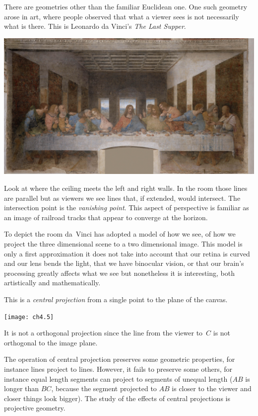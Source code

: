 There are geometries other than the familiar Euclidean one.
One such geometry arose in art, where people observed
that what a viewer sees is not necessarily what is there.
This is Leonardo da Vinci's 
\emph{The Last Supper}.
\begin{center} 
  \includegraphics[width=.5\textwidth]{LastSupper.jpg}
\end{center}
Look at where the ceiling meets the left and right walls.
In the room those lines are parallel but 
as viewers we see lines that, if extended, would intersect.
The intersection point is the \emph{vanishing point}.
This aspect of perspective is familiar as an image of 
railroad tracks that appear to converge at the horizon.

To depict the room da~Vinci has adopted a model of how we see, of how
we project the three dimensional scene to a two dimensional image.
This model is only a first approximation \Dash  it does not take into
account that our retina is curved and our lens bends the light,
that we have binocular vision, or that our brain's processing 
greatly affects what we see \Dash  but nonetheless it is interesting,
both artistically and mathematically.

This is a 
\emph{central projection} 
from a single point to the plane of the canvas.
\begin{center}
  \texttt{[image: ch4.5]}
\end{center}
It is not a orthogonal projection 
since the line
from the viewer to~$C$ is not orthogonal to the image plane.

The operation of  
central projection preserves some geometric 
properties, for instance lines project to lines.
However, it fails to preserve some others, for instance equal 
length segments can project to segments of unequal length 
($AB$ is longer than $BC$, because the
segment projected to $AB$ is closer to the viewer and 
closer things look bigger).
The study of the effects of central projections is projective geometry.

